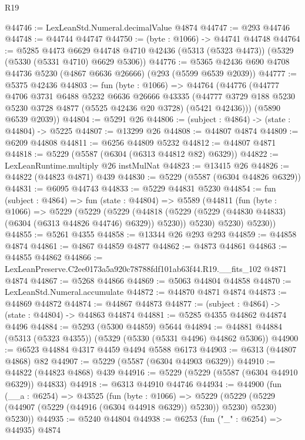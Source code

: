 \begin{lexlean}{R19}
\begin{coremodule}
@44746 := LexLeanStd.Numeral.decimalValue @4874
@44747 := @293 @44746
@44748 := @44744 @44747
@44750 := (byte : @1066) -> @44741 @44748
@44764 := @5285
    @4473
    @6629
    @44748
    @4710
    @42436
    (@5313 (@5323 @4473))
    (@5329 (@5330 (@5331 @4710) @6629 @5306))
@44776 := @5365 @42436 @690 @4708 @44736 @5230 (@4867 @6636 @26666) (@293 (@5599 @6539 @2039))
@44777 := @5375 @42436
@44803 := fun (byte : @1066) =>
  @44764
    (@44776
      (@44777
        @4706
        @3731
        @6488
        @5232
        @6636
        @26666
        @43335
        (@44777 @3729 @188 @5230 @5230 @3728 @4877 (@5525 @42436 @20 @3728) (@5421 @42436)))
      (@5890 @6539 @2039))
@44804 := @5291 @26
@44806 := (subject : @4864) -> (state : @44804) -> @5225
@44807 := @13299 @26
@44808 := @44807 @4874
@44809 := @6209 @44808
@44811 := @6256 @44809 @5232
@44812 := @44807 @4871
@44818 := @5229 (@5587 (@6304 (@6313 @44812 @82) @6329))
@44822 := LexLeanRuntime.multiply @26 instMulNat
@44823 := @13415 @26
@44826 := @44822 (@44823 @4871) @439
@44830 := @5229 (@5587 (@6304 @44826 @6329))
@44831 := @6095 @44743
@44833 := @5229 @44831 @5230
@44854 := fun (subject : @4864) =>
  fun (state : @44804) =>
  @5589
    (@44811
      (fun (byte : @1066) =>
      @5229
        (@5229
          (@5229
            (@44818 (@5229 (@5229 (@44830 @44833) (@6304 (@6313 @44826 @44746) @6329)) @5230))
            @5230)
          @5230)
        @5230))
@44855 := @5261 @4355
@44858 := @13344 @26 @293 @293
@44859 := @44858 @4874
@44861 := @4867 @44859 @4877
@44862 := @4873 @44861
@44863 := @44855 @44862
@44866 := LexLeanPreserve.C2ee0173a5a920c78788fdf101ab63f44.R19.__fits_102 @4871 @4874
@44867 := @5268 @44866
@44869 := @5063 @44804 @44858
@44870 := LexLeanStd.Numeral.accumulate
@44872 := @44870 @4871 @4874
@44873 := @44869 @44872
@44874 := @44867 @44873
@44877 := (subject : @4864) -> (state : @44804) -> @44863 @44874
@44881 := @5285 @4355 @44862 @44874 @4496
@44884 := @5293 (@5300 @44859) @5644
@44894 := @44881 @44884 (@5313 (@5323 @4355)) (@5329 (@5330 (@5331 @4496) @44862 @5306))
@44900 := @6523 @44884 @4317 @4459 @4494 @5588 @6173
@44903 := @6313 (@44807 @4868) @82
@44907 := @5229 (@5587 (@6304 @44903 @6329))
@44910 := @44822 (@44823 @4868) @439
@44916 := @5229 (@5229 (@5587 (@6304 @44910 @6329)) @44833)
@44918 := @6313 @44910 @44746
@44934 := @44900
    (fun (__a : @6254) =>
    @43525
      (fun (byte : @1066) =>
      @5229 (@5229 (@5229 (@44907 (@5229 (@44916 (@6304 @44918 @6329)) @5230)) @5230) @5230) @5230))
@44935 := @5240 @44804
@44938 := @6253 (fun ("_" : @6254) => @44935) @4874

\end{coremodule}
\end{lexlean}
